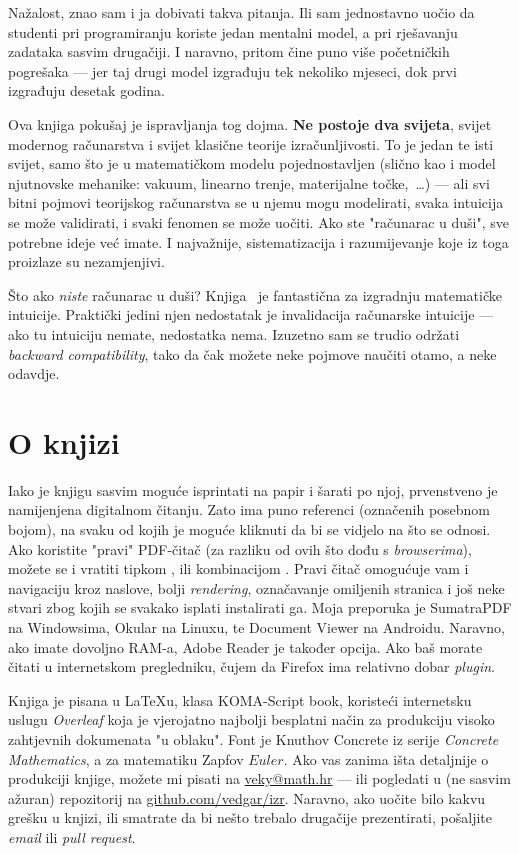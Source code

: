 Nažalost, znao sam i ja dobivati takva pitanja. Ili sam jednostavno uočio da studenti pri programiranju koriste jedan mentalni model, a pri rješavanju zadataka sasvim drugačiji. I naravno, pritom čine puno više početničkih pogrešaka --- jer taj drugi model izgrađuju tek nekoliko mjeseci, dok prvi izgrađuju desetak godina.

Ova knjiga pokušaj je ispravljanja tog dojma. \textbf{Ne postoje dva svijeta}, svijet modernog računarstva i svijet klasične teorije izračunljivosti. To je jedan te isti svijet, samo što je u matematičkom modelu pojednostavljen (slično kao i model njutnovske mehanike: vakuum, linearno trenje, materijalne točke,~\ldots) --- ali svi bitni pojmovi teorijskog računarstva se u njemu mogu modelirati, svaka intuicija se može validirati, i svaki fenomen se može uočiti. Ako ste "računarac u duši", sve potrebne ideje već imate. I najvažnije, sistematizacija i razumijevanje koje iz toga proizlaze su nezamjenjivi.

Što ako \emph{niste} računarac u duši? Knjiga~\cite{skr:Vuk} je fantastična za izgradnju matematičke intuicije. Praktički jedini njen nedostatak je invalidacija računarske intuicije --- ako tu intuiciju nemate, nedostatka nema. Izuzetno sam se trudio održati \emph{backward compatibility}, tako da čak možete neke pojmove naučiti otamo, a neke odavdje.

\section{O knjizi}

Iako je knjigu sasvim moguće isprintati na papir i šarati po njoj, prvenstveno je namijenjena digitalnom čitanju. Zato ima puno referenci (označenih posebnom bojom), na svaku od kojih je moguće kliknuti da bi se vidjelo na što se odnosi. Ako koristite "pravi" PDF-čitač (za razliku od ovih što dođu s \emph{browserima}), možete se i vratiti tipkom \keys{\!$\Mapsfrom$}, ili kombinacijom . Pravi čitač omogućuje vam i navigaciju kroz naslove, bolji \emph{rendering}, označavanje omiljenih stranica i još neke stvari zbog kojih se svakako isplati instalirati ga. Moja preporuka je \textsf{SumatraPDF} na Windowsima, \textsf{Okular} na Linuxu, te \textsf{Document Viewer} na Androidu. Naravno, ako imate dovoljno RAM-a, \textsf{Adobe Reader} je također opcija. Ako baš morate čitati u internetskom pregledniku, čujem da \textsf{Firefox} ima relativno dobar \emph{plugin}.

Knjiga je pisana u \textsf{\LaTeX{}}u, klasa \textsf{KOMA-Script book}, koristeći internetsku uslugu \emph{Overleaf} koja je vjerojatno najbolji besplatni način za produkciju visoko zahtjevnih dokumenata "u oblaku". Font je Knuthov Concrete iz serije \emph{Concrete Mathematics}, a za matematiku Zapfov \AmS{} $Euler$. Ako vas zanima išta detaljnije o produkciji knjige, možete mi pisati na \href{mailto:veky@math.hr}{veky@math.hr} --- ili pogledati u (ne sasvim ažuran) repozitorij na \href{https://github.com/vedgar/izr}{github.com/vedgar/izr}. Naravno, ako uočite bilo kakvu grešku u knjizi, ili smatrate da bi nešto trebalo drugačije prezentirati, pošaljite \emph{email} ili \emph{pull request}.


